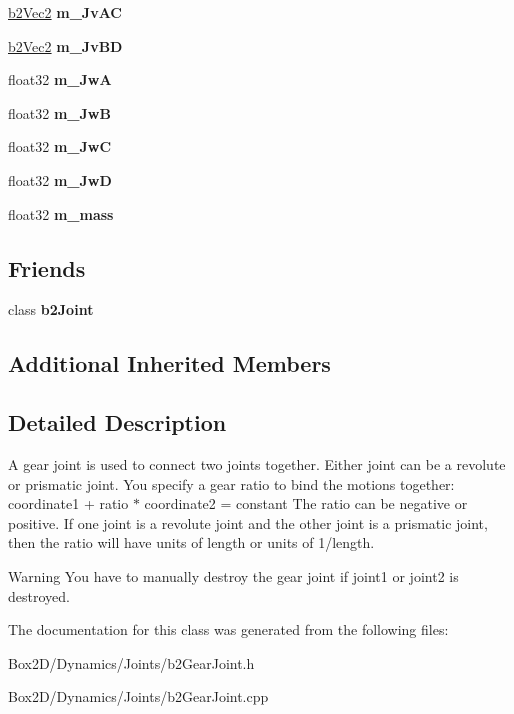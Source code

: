 \begin{DoxyCompactItemize}
\hyperlink{structb2_vec2}{b2\+Vec2} {\bfseries m\+\_\+\+Jv\+AC}
\item 
\mbox{\label{classb2_gear_joint_ab00b00c061d8b9e461f76ac4d72aac8c}} 
\hyperlink{structb2_vec2}{b2\+Vec2} {\bfseries m\+\_\+\+Jv\+BD}
\item 
\mbox{\label{classb2_gear_joint_a3774fc69538e658f123d9437934aed70}} 
float32 {\bfseries m\+\_\+\+JwA}
\item 
\mbox{\label{classb2_gear_joint_afcdb0ebe31ff8039771d006f4b87645c}} 
float32 {\bfseries m\+\_\+\+JwB}
\item 
\mbox{\label{classb2_gear_joint_ac9b8f418c8f79392049afdf18aa6dc3e}} 
float32 {\bfseries m\+\_\+\+JwC}
\item 
\mbox{\label{classb2_gear_joint_ac2d00521ef5f7c27b1747ad54d4ad5c2}} 
float32 {\bfseries m\+\_\+\+JwD}
\item 
\mbox{\label{classb2_gear_joint_a71ac3578918bc97d257d652777b6b87f}} 
float32 {\bfseries m\+\_\+mass}
\end{DoxyCompactItemize}
\subsection*{Friends}
\begin{DoxyCompactItemize}
\item 
\mbox{\label{classb2_gear_joint_a54ade8ed3d794298108d7f4c4e4793fa}} 
class {\bfseries b2\+Joint}
\end{DoxyCompactItemize}
\subsection*{Additional Inherited Members}


\subsection{Detailed Description}
A gear joint is used to connect two joints together. Either joint can be a revolute or prismatic joint. You specify a gear ratio to bind the motions together\+: coordinate1 + ratio $\ast$ coordinate2 = constant The ratio can be negative or positive. If one joint is a revolute joint and the other joint is a prismatic joint, then the ratio will have units of length or units of 1/length. \begin{DoxyWarning}{Warning}
You have to manually destroy the gear joint if joint1 or joint2 is destroyed. 
\end{DoxyWarning}


The documentation for this class was generated from the following files\+:\begin{DoxyCompactItemize}
\item 
Box2\+D/\+Dynamics/\+Joints/b2\+Gear\+Joint.\+h\item 
Box2\+D/\+Dynamics/\+Joints/b2\+Gear\+Joint.\+cpp\end{DoxyCompactItemize}
